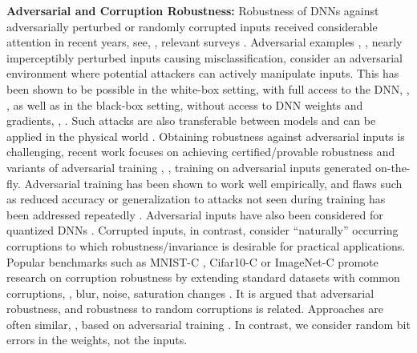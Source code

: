 \textbf{Adversarial and Corruption Robustness:} Robustness of DNNs against adversarially perturbed or randomly corrupted inputs received considerable attention in recent years, see, \eg, relevant surveys \citep{BiggioARXIV2018,XuARXIV2019}. Adversarial examples \citep{SzegedyARXIV2013}, \ie, nearly imperceptibly perturbed inputs causing misclassification, consider an adversarial environment where potential attackers can actively manipulate inputs. This has been shown to be possible in the white-box setting, with full access to the DNN, \eg, \citep{MadryICLR2018,CarliniSP2017,DongARXIV2017,ChiangARXIV2019,CroceARXIV2020}, as well as in the black-box setting, without access to DNN weights and gradients, \eg, \citep{ChenAISEC2017,IlyasICML2018,CroceARXIV2019,AndriushchenkoARXIV2019}. Such attacks are also transferable between models \citep{LiuARXIV2016} and can be applied in the physical world \citep{LuARXIV2017,KurakinARXIV2016b}. Obtaining robustness against adversarial inputs is challenging, recent work focuses on achieving certified/provable robustness \citep{PeckNIPS2017,ZhangNIPS2018,WongICML2018,GorwalARXIV2019} and variants of adversarial training \citep{MiyatoARXIV2015,HuangARXIV2015,MadryICLR2018}, \ie, training on adversarial inputs generated on-the-fly. Adversarial training has been shown to work well empirically, and flaws such as reduced accuracy \citep{StutzCVPR2019,TsiprasICLR2019} or generalization to attacks not seen during training has been addressed repeatedly \citep{CarmonARXIV2019,UesatoARXIV2019,StutzICML2020,TramerARXIV2019,MainiARXIV2019}. Adversarial inputs have also been considered for quantized DNNs \citep{KhalilICLR2019}. Corrupted inputs, in contrast, consider ``naturally'' occurring corruptions to which robustness/invariance is desirable for practical applications. Popular benchmarks such as MNIST-C \citep{MuICMLWORK2019}, Cifar10-C or ImageNet-C \citep{HendrycksARXIV2019} promote research on corruption robustness by extending standard datasets with common corruptions, \eg, blur, noise, saturation changes \etc. It is argued that adversarial robustness, and robustness to random corruptions is related. Approaches are often similar, \eg, based on adversarial training \citep{StutzICML2020,LopesICMLWORK2019,KangARXIV2019}. In contrast, we consider random bit errors in the weights, not the inputs.

